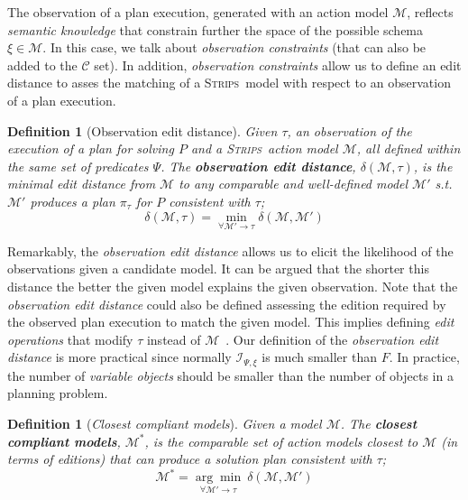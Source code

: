 \documentclass[letterpaper]{article} %
\newcommand{\strips}{\textsc{Strips}}     %
\newtheorem{definition}[theorem]{Definition}
\begin{document}
The observation of a plan execution, generated with an action model $\mathcal{M}$, reflects {\em semantic knowledge} that constrain further the space of the possible schema $\xi\in \mathcal{M}$. In this case, we talk about {\em observation constraints} (that can also be added to the $\mathcal{C}$ set). In addition, {\em observation constraints} allow us to define an edit distance to asses the matching of a \strips\ model with respect to an observation of a plan execution. 

\begin{definition}[Observation edit distance]
  Given $\tau$, an observation of the execution of a plan for solving $P$ and a \strips\ action model $\mathcal{M}$, all defined within the same set of predicates $\Psi$. The {\bf observation edit distance}, $\delta(\mathcal{M},\tau)$, is the minimal edit distance from $\mathcal{M}$ to any {\em comparable} and well-defined model $\mathcal{M}'$ s.t. $\mathcal{M}'$ produces a plan $\pi_\tau$ for $P$ {\em consistent} with $\tau$; \[\delta(\mathcal{M},\tau)=\min_{\forall \mathcal{M}' \rightarrow \tau} \delta(\mathcal{M},\mathcal{M}')\]
\end{definition}

Remarkably, the {\em observation edit distance} allows us to elicit the likelihood of the observations given a candidate model. It can be argued that the shorter this  distance the better the given model explains the given observation. Note that the {\em observation edit distance} could also be defined assessing the edition required by the observed plan execution to match the given model. This implies defining {\em edit operations} that modify $\tau$ instead of $\mathcal{M}$~\cite{sohrabi:precognition:IJCAI2016}. Our definition of the {\em observation edit distance} is more practical since normally ${\mathcal I}_{\Psi,\xi}$ is much smaller than $F$. In practice, the number of {\em variable objects} should be smaller than the number of objects in a planning problem.

\begin{definition}[{\em Closest compliant models}] \label{compliant}
Given a model $\mathcal{M}$. The {\bf closest compliant models}, $\mathcal{M^*}$, is the comparable set of action models closest to $\mathcal{M}$ (in terms of editions) that can produce a solution plan consistent with $\tau$;
  \[\mathcal{M^*}=\underset{\forall \mathcal{M}' \rightarrow \tau}{\arg\min}\ \delta(\mathcal{M},\mathcal{M}') \]
\end{definition}
\end{document}
